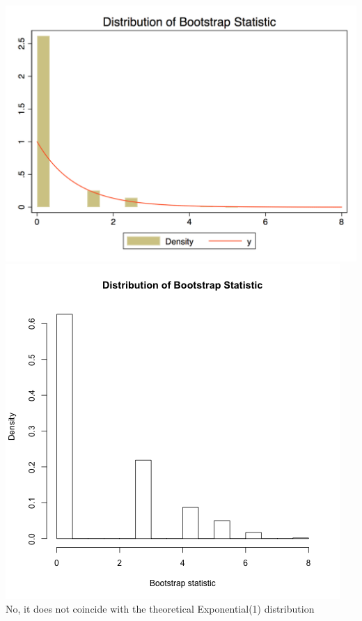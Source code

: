 \documentclass[12pt]{article}
\begin{document}
\subsection{}
\includegraphics[totalheight=6cm]{hw3_Q3_1_stata.png}
\includegraphics[totalheight=6cm]{hw3_q3_2_r.png}\\

No, it does not coincide with the theoretical Exponential(1) distribution
\end{document}
